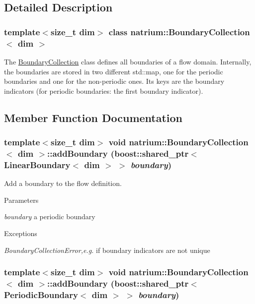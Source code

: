 \subsection{Detailed Description}
\subsubsection*{template$<$size\_\-t dim$>$ class natrium::BoundaryCollection$<$ dim $>$}

The \hyperlink{classnatrium_1_1BoundaryCollection}{BoundaryCollection} class defines all boundaries of a flow domain. Internally, the boundaries are stored in two different std::map, one for the periodic boundaries and one for the non-\/periodic ones. Its keys are the boundary indicators (for periodic boundaries: the first boundary indicator). 

\subsection{Member Function Documentation}
\hypertarget{classnatrium_1_1BoundaryCollection_a34251a8325b51b6a7c82414a08a79914}{
\subsubsection[{addBoundary}]{\setlength{\rightskip}{0pt plus 5cm}template$<$size\_\-t dim$>$ void {\bf natrium::BoundaryCollection}$<$ dim $>$::addBoundary (boost::shared\_\-ptr$<$ {\bf LinearBoundary}$<$ dim $>$ $>$ {\em boundary})}}
\label{classnatrium_1_1BoundaryCollection_a34251a8325b51b6a7c82414a08a79914}


Add a boundary to the flow definition. 
\begin{DoxyParams}{Parameters}
\item[{\em boundary}]a periodic boundary \end{DoxyParams}

\begin{DoxyExceptions}{Exceptions}
\item[{\em BoundaryCollectionError,e.g.}]if boundary indicators are not unique \end{DoxyExceptions}
\hypertarget{classnatrium_1_1BoundaryCollection_a9f957b5338bca01c7bd8c21576ec922c}{
\subsubsection[{addBoundary}]{\setlength{\rightskip}{0pt plus 5cm}template$<$size\_\-t dim$>$ void {\bf natrium::BoundaryCollection}$<$ dim $>$::addBoundary (boost::shared\_\-ptr$<$ {\bf PeriodicBoundary}$<$ dim $>$ $>$ {\em boundary})}}
\label{classnatrium_1_1BoundaryCollection_a9f957b5338bca01c7bd8c21576ec922c}


